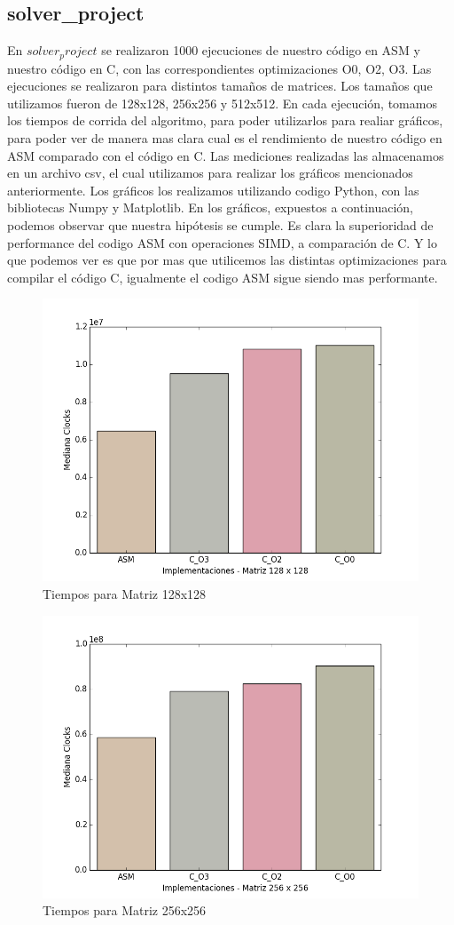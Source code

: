 \pagebreak

\subsection{solver\_project}

En $solver_project$ se realizaron 1000 ejecuciones de nuestro c\'odigo en ASM y nuestro c\'odigo en C, con las correspondientes optimizaciones O0, O2, O3. Las ejecuciones se realizaron para distintos tamaños de matrices.
Los tamaños que utilizamos fueron de 128x128, 256x256 y 512x512.
En cada ejecuci\'on, tomamos los tiempos de corrida del algoritmo, para poder utilizarlos para realiar gr\'aficos, para poder ver de manera mas clara cual es el rendimiento de nuestro c\'odigo en ASM comparado con el c\'odigo en C.
Las mediciones realizadas las almacenamos en un archivo csv, el cual utilizamos para realizar los gr\'aficos mencionados anteriormente.
Los gr\'aficos los realizamos utilizando codigo Python, con las bibliotecas Numpy y Matplotlib.
En los gr\'aficos, expuestos a continuaci\'on, podemos observar que nuestra hip\'otesis se cumple.
Es clara la superioridad de performance del codigo ASM con operaciones SIMD, a comparaci\'on de C.
Y lo que podemos ver es que por mas que utilicemos las distintas optimizaciones para compilar el c\'odigo C, igualmente el codigo ASM sigue siendo mas performante.

\begin{figure}[h]
  \centering
    \includegraphics[width=.6\linewidth]{128x128.png}
    \caption{Tiempos para Matriz 128x128}
    \label{fig:M128}
\end{figure}

\pagebreak

\begin{figure}[h]
  \centering
    \includegraphics[width=.6\linewidth]{256x256.png}
    \caption{Tiempos para Matriz 256x256}
    \label{fig:M256}
\end{figure}

